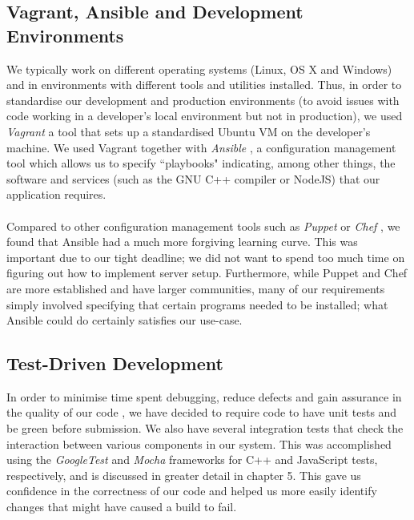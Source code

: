 \documentclass[a4paper, 10pt]{report}
\begin{document}
\subsection{Vagrant, Ansible and Development Environments}
We typically work on different operating systems (Linux, OS X and Windows) and in environments with different tools and utilities installed. Thus, in order to standardise our development and production environments (to avoid issues with code working in a developer's local environment but not in production), we used \textit{Vagrant} \cite{vagrant} a tool that sets up a standardised Ubuntu VM on the developer's machine. We used Vagrant together with \textit{Ansible} \cite{ansible}, a configuration management tool which allows us to specify ``playbooks" indicating, among other things, the software and services (such as the GNU C++ compiler or NodeJS) that our application requires. \\\\
Compared to other configuration management tools such as \textit{Puppet} \cite{puppet} or \textit{Chef} \cite{chef}, we found that Ansible had a much more forgiving learning curve. This was important due to our tight deadline; we did not want to spend too much time on figuring out how to implement server setup. Furthermore, while Puppet and Chef are more established and have larger communities, many of our requirements simply involved specifying that certain programs needed to be installed; what Ansible could do certainly satisfies our use-case.
\subsection{Test-Driven Development}
In order to minimise time spent debugging, reduce defects and gain assurance in the quality of our code \cite{tdd}, we have decided to require code to have unit tests and be green before submission. We also have several integration tests that check the interaction between various components in our system. This was accomplished using the \textit{GoogleTest} \cite{googletest} and \textit{Mocha} \cite{mocha} frameworks for C++ and JavaScript tests, respectively, and is discussed in greater detail in chapter 5. This gave us confidence in the correctness of our code and helped us more easily identify changes that might have caused a build to fail.
\end{document}
